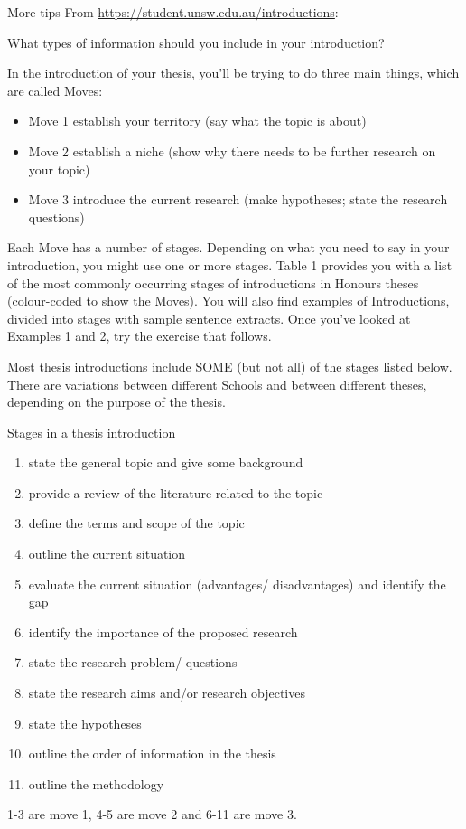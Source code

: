 \begin{anfxnote}{More tips}
From \url{https://student.unsw.edu.au/introductions}:

What types of information should you include in your introduction? 

In the introduction of your thesis, you’ll be trying to do three main things, which are called Moves:

\begin{itemize}
    \item Move 1 establish your territory (say what the topic is about)
    \item Move 2 establish a niche (show why there needs to be further research on your topic)
    \item Move 3 introduce the current research (make hypotheses; state the research questions)
\end{itemize}

Each Move has a number of stages. Depending on what you need to say in your introduction, you might use one or more stages. Table 1 provides you with a list of the most commonly occurring stages of introductions in Honours theses (colour-coded to show the Moves). You will also find examples of Introductions, divided into stages with sample sentence extracts. Once you’ve looked at Examples 1 and 2, try the exercise that follows.

Most thesis introductions include SOME (but not all) of the stages listed below. There are variations between different Schools and between different theses, depending on the purpose of the thesis.

Stages in a thesis introduction
\begin{enumerate}
    \item state the general topic and give some background
    \item provide a review of the literature related to the topic
    \item define the terms and scope of the topic
    \item outline the current situation
    \item evaluate the current situation (advantages/ disadvantages) and identify the gap
    \item identify the importance of the proposed research
    \item state the research problem/ questions
    \item state the research aims and/or research objectives
    \item state the hypotheses
    \item outline the order of information in the thesis
    \item outline the methodology
\end{enumerate}

1-3 are move 1, 4-5 are move 2 and 6-11 are move 3.

\end{anfxnote}

